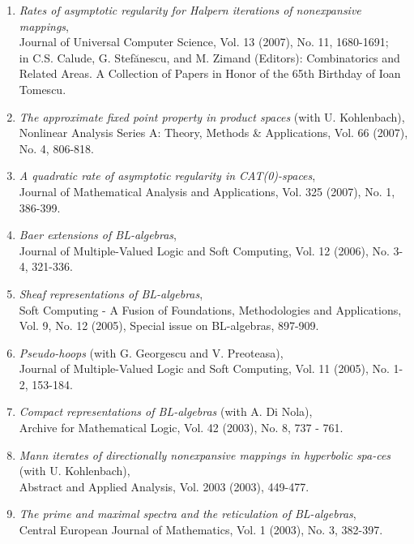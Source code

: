 \documentclass[12pt]{article}
\begin{document}
\begin{enumerate}
\item\label{Halpern-as-reg}
{\em Rates of asymptotic regularity for Halpern iterations of nonexpansive mappings},\\
Journal of Universal Computer Science,  Vol. 13 (2007), No. 11, 1680-1691;\\
in C.S. Calude, G. Stef\u{a}nescu, and M. Zimand (Editors): Combinatorics and Related Areas. A Collection of Papers in Honor of the 65th Birthday of Ioan Tomescu.

\item \label{AFPP-product} {\em The approximate fixed point property  in product spaces} (with U. Kohlenbach), \\
Nonlinear Analysis Series A: Theory, Methods \& Applications,  Vol. 66 (2007), No. 4, 806-818.

\item\label{quadratic} {\em A quadratic rate of asymptotic regularity in CAT(0)-spaces}, \\
Journal of Mathematical Analysis and Applications, Vol. 325 (2007), No. 1, 386-399.

\item {\em Baer extensions of BL-algebras}, \\
Journal of Multiple-Valued Logic and Soft Computing, Vol. 12 (2006), No. 3-4,  321-336.

\item {\em Sheaf representations of BL-algebras}, \\ Soft Computing - A Fusion of Foundations, Methodologies and Applications, Vol. 9, No. 12 (2005),  Special issue on BL-algebras, 897-909.

\item \label{ps-hoops} {\em Pseudo-hoops} (with G. Georgescu and V. Preoteasa), \\ Journal of Multiple-Valued Logic and Soft Computing, Vol. 11 (2005), No. 1-2, 153-184.

\item\label{compact}{\em  Compact representations of BL-algebras} (with A. Di Nola), \\ 
Archive for Mathematical Logic, Vol. 42 (2003),  No. 8, 737 - 761.


\item \label{LL+Ulrich-AAA} {\em Mann iterates of directionally nonexpansive mappings in hyperbolic spa-ces} (with  U. Kohlenbach),\\
Abstract and Applied Analysis, Vol. 2003 (2003), 449-477.

\item {\em The prime and maximal spectra and the reticulation of BL-algebras}, \\ 
Central European Journal of Mathematics, Vol. 1 (2003), No. 3, 382-397.


\end{enumerate}
\end{document}
